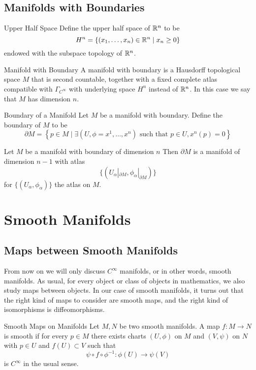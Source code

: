 \documentclass[a4paper]{article}
\begin{document}
\subsection{Manifolds with Boundaries}
\begin{defn}{Upper Half Space}{} Define the upper half space of $\mathbb{R}^n$ to be $$H^n=\{(x_1,\dots,x_n)\in\mathbb{R}^n\;|\;x_n\geq 0\}$$ endowed with the subspace topology of $\mathbb{R}^n$. 
\end{defn}

\begin{defn}{Manifold with Boundary}{} A manifold with boundary is a Hausdorff topological space $M$ that is second countable, together with a fixed complete atlas compatible with $\Gamma_{C^\infty}$ with underlying space $H^n$ instead of $\mathbb{R}^n$. In this case we say that $M$ has dimension $n$. 
\end{defn}

\begin{defn}{Boundary of a Manifold}{} Let $M$ be a manifold with boundary. Define the boundary of $M$ to be $$\partial M=\left\{p\in M\;|\;\exists(U,\phi=x^1,\dots,x^n)\text{ such that }p\in U, x^n(p)=0\right\}$$
\end{defn}

\begin{prp}{}{} Let $M$ be a manifold with boundary of dimension $n$ Then $\partial M$ is a manifold of dimension $n-1$ with atlas $$\{(U_\alpha|_{\partial M},\phi_\alpha|_{\partial M})\}$$ for $\{(U_\alpha,\phi_\alpha)\}$ the atlas on $M$. 
\end{prp}

\pagebreak
\section{Smooth Manifolds}
\subsection{Maps between Smooth Manifolds}
From now on we will only discuss $C^\infty$ manifolds, or in other words, smooth manifolds. As usual, for every object or class of objects in mathematics, we also study maps between objects. In our case of smooth manifolds, it turns out that the right kind of maps to consider are smooth maps, and the right kind of isomorphisms is diffeomorphisms. 
\begin{defn}{Smooth Maps on Manifolds}{} Let $M,N$ be two smooth manifolds. A map $f:M\to N$ is smooth if for every $p\in M$ there exists charts $(U,\phi)$ on $M$ and $(V,\psi)$ on $N$ with $p\in U$ and $f(U)\subset V$ such that $$\psi\circ f\circ\phi^{-1}:\phi(U)\to\psi(V)$$ is $C^\infty$ in the usual sense. 
\end{defn}
\end{document}
